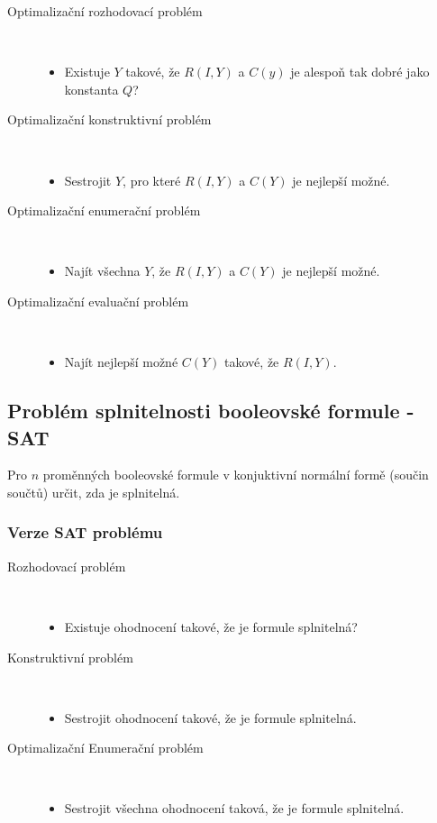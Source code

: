 \begin{description}
    \item[Optimalizační rozhodovací problém] \
    \begin{itemize}
        \item Existuje $Y$ takové, že $R(I, Y)$ a $C(y)$ je alespoň tak dobré jako konstanta $Q$?
    \end{itemize}

    \item[Optimalizační konstruktivní problém] \
    \begin{itemize}
        \item Sestrojit $Y$, pro které $R(I, Y)$ a $C(Y)$ je nejlepší možné.
    \end{itemize}

    \item[Optimalizační enumerační problém] \
    \begin{itemize}
        \item Najít všechna $Y$, že $R(I, Y)$ a $C(Y)$ je nejlepší možné.
    \end{itemize}

    \item[Optimalizační evaluační problém] \
    \begin{itemize}
        \item Najít nejlepší možné $C(Y)$ takové, že $R(I, Y)$.
    \end{itemize}
\end{description}

\subsection{Problém splnitelnosti booleovské formule - SAT}

Pro $n$ proměnných booleovské formule v konjuktivní normální formě (součin součtů) určit, zda je splnitelná.

\subsubsection{Verze SAT problému}

\begin{description}
    \item[Rozhodovací problém] \
    \begin{itemize}
        \item Existuje ohodnocení takové, že je formule splnitelná?
    \end{itemize}

    \item[Konstruktivní problém] \
    \begin{itemize}
        \item Sestrojit ohodnocení takové, že je formule splnitelná.
    \end{itemize}

    \item[Optimalizační Enumerační problém] \
    \begin{itemize}
        \item Sestrojit všechna ohodnocení taková, že je formule splnitelná.
    \end{itemize}
\end{description}

